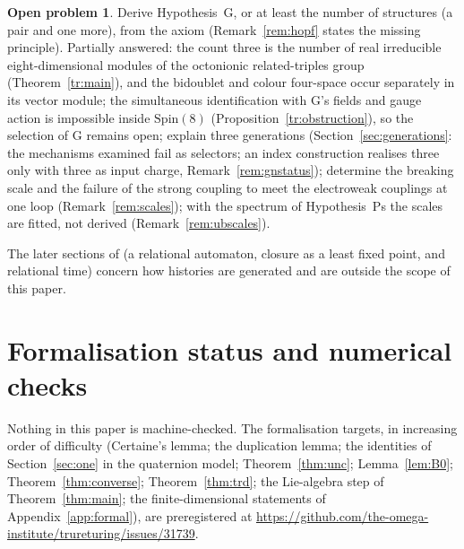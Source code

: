\documentclass[aps,pra,onecolumn,superscriptaddress,nofootinbib,10pt]{revtex4-2}
\theoremstyle{definition}
\newtheorem{problem}{Open problem}
\theoremstyle{remark}
\begin{document}
\begin{problem}
Derive Hypothesis~G, or at least the number of structures (a pair and one more), from the axiom
(Remark~\ref{rem:hopf} states the missing principle).  Partially answered: the count three is the number of
real irreducible eight-dimensional modules of the octonionic related-triples group (Theorem~\ref{tr:main}),
and the bidoublet and colour four-space occur separately in its vector module; the simultaneous
identification with G's fields and gauge action is impossible inside $\mathrm{Spin}(8)$
(Proposition~\ref{tr:obstruction}), so the selection of G remains open; explain three generations (Section~\ref{sec:generations}: the mechanisms examined fail as selectors; an index
construction realises three only with three as input charge, Remark~\ref{rem:gnstatus}); determine the
breaking scale and the failure of the strong coupling to meet the electroweak couplings at one loop
(Remark~\ref{rem:scales}); with the spectrum of Hypothesis~Ps the scales are fitted, not derived
(Remark~\ref{rem:ubscales}).
\end{problem}
\noindent The later sections of \cite{CRQO} (a relational automaton, closure as a least fixed point,
and relational time) concern how histories are generated and are outside the scope of this paper.

\section{Formalisation status and numerical checks}\label{sec:lean}
{\sloppy Nothing in this paper is machine-checked.  The formalisation targets, in increasing order of
difficulty (Certaine's lemma; the duplication lemma; the identities of Section~\ref{sec:one} in the
quaternion model; Theorem~\ref{thm:unc}; Lemma~\ref{lem:B0}; Theorem~\ref{thm:converse};
Theorem~\ref{thm:trd}; the Lie-algebra step of Theorem~\ref{thm:main}; the finite-dimensional statements
of Appendix~\ref{app:formal}), are preregistered at
\url{https://github.com/the-omega-institute/trureturing/issues/31739}.\par}
\end{document}
